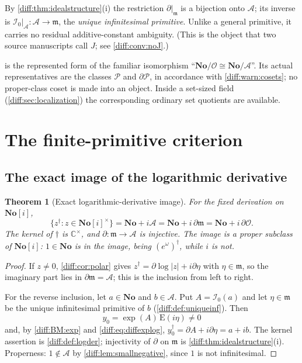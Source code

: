 \documentclass[11pt,letterpaper]{article}
\numberwithin{equation}{section}
\newtheorem{theorem}{Theorem}[section]
\theoremstyle{definition}
\theoremstyle{remark}
\newcommand{\No}{\mathbf{No}}
\newcommand{\SC}{\mathbf{No}[i]}
\newcommand{\C}{\mathbb C}
\newcommand{\der}{\partial}
\newcommand{\Ofin}{\mathcal O}
\newcommand{\mm}{\mathfrak m}
\newcommand{\Pcl}{\mathcal P}
\newcommand{\Acl}{\mathcal A}
\newcommand{\Izero}{\mathcal I_{0}}
\newcommand{\Emm}{\mathrm{E}}
\newcommand{\abs}[1]{\lvert#1\rvert}
\begin{document}
\begin{definition}
\label{diff:def:uniqueinf}
By \cref{diff:thm:idealstructure}(i) the restriction $\der|_{\mm}$ is a
bijection onto $\Acl$; its inverse is $\Izero|_{\Acl}:\Acl\to\mm$, the
\emph{unique infinitesimal primitive}. Unlike a general primitive, it carries
no residual additive-constant ambiguity. (This is the object that two source
manuscripts call $J$; see \cref{diff:conv:noJ}.)
\end{definition}

\begin{remark}
\label{diff:rem:representedquotient}
 is the represented form of the familiar
isomorphism ``$\No/\Ofin\cong\No/\Acl$''. Its actual representatives are the
classes $\Pcl$ and $\der\Pcl$, in accordance with
\cref{diff:warn:cosets}; no proper-class coset is made into an object. Inside a
set-sized field (\cref{diff:sec:localization}) the corresponding ordinary set
quotients are available.
\end{remark}
\section{The finite-primitive criterion}
\label{diff:sec:phasecrit}

\subsection{The exact image of the logarithmic derivative}
\label{diff:sub:logimage}

\begin{theorem}[Exact logarithmic-derivative image]
\label{diff:thm:logimage}
For the fixed derivation on $\SC$,
\begin{equation}\label{diff:eq:logimage}
 \boxed{\quad
 \{z^{\dagger}:z\in\SC^{\times}\}
 =\No+i\Acl
 =\No+i\,\der\mm
 =\No+i\,\der\Ofin .
 \quad}
\end{equation}
The kernel of $\dagger$ is $\C^{\times}$, and $\der:\mm\to\Acl$ is injective.
The image is a \emph{proper} subclass of $\SC$: $1\in\No$ is in the image,
being $(e^{\omega})^{\dagger}$, while $i$ is not.
\end{theorem}
\begin{proof}
If $z\neq0$, \cref{diff:cor:polar} gives
$z^{\dagger}=\der\log\abs z+i\der\eta$ with $\eta\in\mm$, so the imaginary
part lies in $\der\mm=\Acl$; this is the inclusion from left to right.

For the reverse inclusion, let $a\in\No$ and $b\in\Acl$. Put $A=\Izero(a)$ and
let $\eta\in\mm$ be the unique infinitesimal primitive of $b$
(\cref{diff:def:uniqueinf}). Then
\begin{equation}\label{diff:eq:generator}
 y_{0}=\exp(A)\,\Emm(i\eta)\neq0
\end{equation}
and, by \ref{diff:BM:exp} and \cref{diff:eq:diffexplog},
$y_{0}^{\dagger}=\der A+i\der\eta=a+ib$. The kernel assertion is
\cref{diff:def:logder}; injectivity of $\der$ on $\mm$ is
\cref{diff:thm:idealstructure}(i). Properness: $1\notin\Acl$ by
\cref{diff:lem:smallnegative}, since $1$ is not infinitesimal.
\end{proof}
\end{document}
